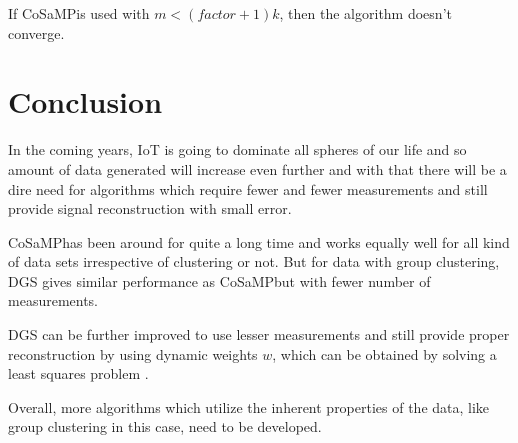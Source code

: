 \documentclass[12pt]{article}
\makeatletter
\theoremstyle{definition}
\def\cosamp{CoSaMP\hspace{0.1in}}
\newcounter{eqn}
\renewcommand*{\theeqn}{\alph{eqn})}
\newcommand{\num}{\refstepcounter{eqn}\text{\theeqn}\;}
\newcommand{\putindeepbox}[2][0.7\baselineskip]{{%
    \setbox0=\hbox{#2}%
    \setbox0=\vbox{\noindent\hsize=\wd0\unhbox0}
    \@tempdima=\dp0
    \advance\@tempdima by \ht0
    \advance\@tempdima by -#1\relax
    \dp0=\@tempdima
    \ht0=#1\relax
    \box0
}}
\makeatother
\begin{document}

\par If \cosamp is used with $m < (factor+1) k$, then the algorithm doesn't converge.

\section{Conclusion}
In the coming years, IoT is going to dominate all spheres of our life and so amount of data generated
will increase even further and with that there will be a dire need for algorithms which require 
fewer and fewer measurements and still provide signal reconstruction with small error.

\par \cosamp has been around for quite a long time and works equally well for all kind of data
sets irrespective of clustering or not. But for data with group clustering, DGS gives similar
performance as \cosamp but with fewer number of measurements.

\par DGS can be further improved to use lesser measurements and still provide proper reconstruction
by using dynamic weights $w$, which can be obtained by solving a least squares problem \cite{Li-CS_in_IoT}.
\par Overall, more algorithms which utilize the inherent properties of the data, 
like group clustering in this case, need to be developed.


\end{document}

